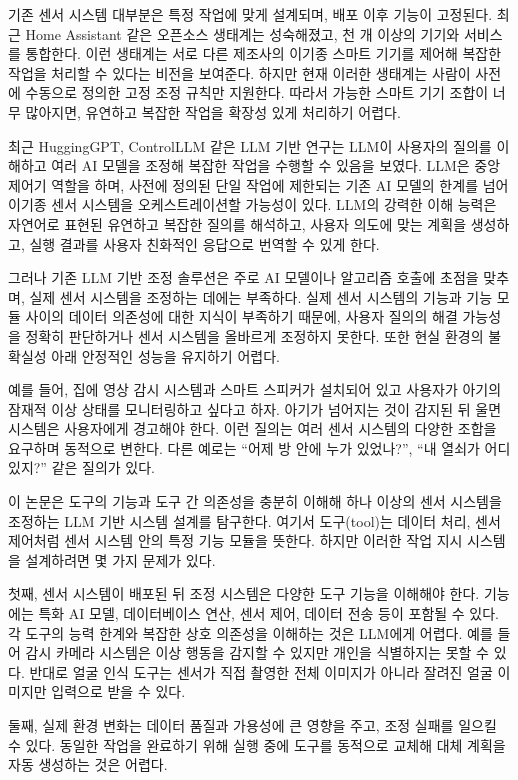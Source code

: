 \documentclass[sigconf,nonacm]{acmart}
\begin{document}
기존 센서 시스템 대부분은 특정 작업에 맞게 설계되며, 배포 이후 기능이 고정된다. 최근 Home Assistant 같은 오픈소스 생태계는 성숙해졌고, 천 개 이상의 기기와 서비스를 통합한다. 이런 생태계는 서로 다른 제조사의 이기종 스마트 기기를 제어해 복잡한 작업을 처리할 수 있다는 비전을 보여준다. 하지만 현재 이러한 생태계는 사람이 사전에 수동으로 정의한 고정 조정 규칙만 지원한다. 따라서 가능한 스마트 기기 조합이 너무 많아지면, 유연하고 복잡한 작업을 확장성 있게 처리하기 어렵다.

최근 HuggingGPT, ControlLLM 같은 LLM 기반 연구는 LLM이 사용자의 질의를 이해하고 여러 AI 모델을 조정해 복잡한 작업을 수행할 수 있음을 보였다. LLM은 중앙 제어기 역할을 하며, 사전에 정의된 단일 작업에 제한되는 기존 AI 모델의 한계를 넘어 이기종 센서 시스템을 오케스트레이션할 가능성이 있다. LLM의 강력한 이해 능력은 자연어로 표현된 유연하고 복잡한 질의를 해석하고, 사용자 의도에 맞는 계획을 생성하고, 실행 결과를 사용자 친화적인 응답으로 번역할 수 있게 한다.

그러나 기존 LLM 기반 조정 솔루션은 주로 AI 모델이나 알고리즘 호출에 초점을 맞추며, 실제 센서 시스템을 조정하는 데에는 부족하다. 실제 센서 시스템의 기능과 기능 모듈 사이의 데이터 의존성에 대한 지식이 부족하기 때문에, 사용자 질의의 해결 가능성을 정확히 판단하거나 센서 시스템을 올바르게 조정하지 못한다. 또한 현실 환경의 불확실성 아래 안정적인 성능을 유지하기 어렵다.

예를 들어, 집에 영상 감시 시스템과 스마트 스피커가 설치되어 있고 사용자가 아기의 잠재적 이상 상태를 모니터링하고 싶다고 하자. 아기가 넘어지는 것이 감지된 뒤 울면 시스템은 사용자에게 경고해야 한다. 이런 질의는 여러 센서 시스템의 다양한 조합을 요구하며 동적으로 변한다. 다른 예로는 “어제 방 안에 누가 있었나?”, “내 열쇠가 어디 있지?” 같은 질의가 있다.

이 논문은 도구의 기능과 도구 간 의존성을 충분히 이해해 하나 이상의 센서 시스템을 조정하는 LLM 기반 시스템 설계를 탐구한다. 여기서 도구(tool)는 데이터 처리, 센서 제어처럼 센서 시스템 안의 특정 기능 모듈을 뜻한다. 하지만 이러한 작업 지시 시스템을 설계하려면 몇 가지 문제가 있다.

첫째, 센서 시스템이 배포된 뒤 조정 시스템은 다양한 도구 기능을 이해해야 한다. 기능에는 특화 AI 모델, 데이터베이스 연산, 센서 제어, 데이터 전송 등이 포함될 수 있다. 각 도구의 능력 한계와 복잡한 상호 의존성을 이해하는 것은 LLM에게 어렵다. 예를 들어 감시 카메라 시스템은 이상 행동을 감지할 수 있지만 개인을 식별하지는 못할 수 있다. 반대로 얼굴 인식 도구는 센서가 직접 촬영한 전체 이미지가 아니라 잘려진 얼굴 이미지만 입력으로 받을 수 있다.

둘째, 실제 환경 변화는 데이터 품질과 가용성에 큰 영향을 주고, 조정 실패를 일으킬 수 있다. 동일한 작업을 완료하기 위해 실행 중에 도구를 동적으로 교체해 대체 계획을 자동 생성하는 것은 어렵다.
\end{document}
